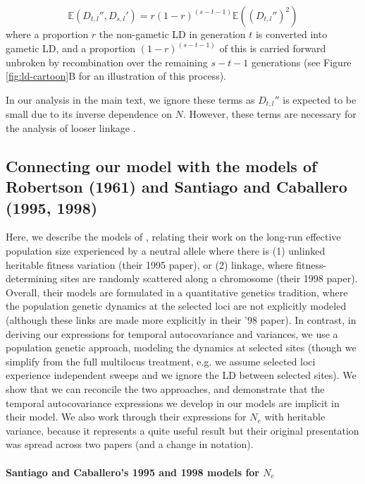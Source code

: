 \documentclass[11pt]{article}
\newcommand{\E}{\mathbb{E}}
\begin{document}
\begin{equation}
  \E(D_{t,l}'',D_{s,l}') = r(1-r)^{(s-t-1)} \E\left((D_{t,l}'')^2\right)
  \end{equation}
%
where a proportion $r$ the non-gametic LD in generation $t$ is converted into
gametic LD, and a proportion $(1-r)^{(s-t-1)}$ of this is carried forward
unbroken by recombination over the remaining $s-t-1$ generations (see Figure
\ref{fig:ld-cartoon}B for an illustration of this process).

In our analysis in the main text, we ignore these terms as $D_{t,l}''$ is
expected to be small due to its inverse dependence on $N$. However, these terms
are necessary for the analysis of looser linkage
\parencite{Santiago1995-hx,Santiago1998-bs}. 

\subsection{Connecting our model with the models of Robertson (1961) and Santiago and Caballero (1995, 1998)}
\label{ap:connecting-sc}

Here, we describe the models of \textcite{Santiago1995-hx,Santiago1998-bs},
relating their work on the long-run effective population size experienced by a
neutral allele where there is (1) unlinked heritable fitness variation (their
1995 paper), or (2) linkage, where fitness-determining sites are randomly
scattered along a chromosome (their 1998 paper). Overall, their models are
formulated in a quantitative genetics tradition, where the population genetic
dynamics at the selected loci are not explicitly modeled (although these links
are made more explicitly in their '98 paper). In contrast, in deriving our
expressions for temporal autocovariance and variances, we use a population
genetic approach, modeling the dynamics at selected sites (though we simplify
from the full multilocus treatment, e.g. we assume selected loci experience
independent sweeps and we ignore the LD between selected sites). We show that
we can reconcile the two approaches, and demonstrate that the temporal
autocovariance expressions we develop in our models are implicit in their
model. We also work through their expressions for $N_e$ with heritable
variance, because it represents a quite useful result but their original
presentation was spread across two papers (and a change in notation).

\paragraph{Santiago and Caballero's 1995 and 1998 models for $N_e$}
\end{document}
